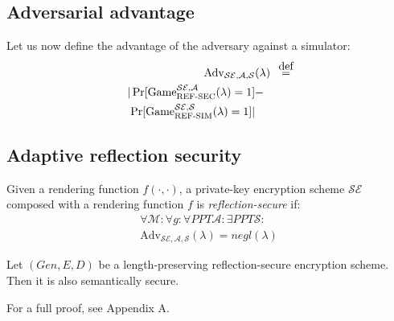 \subsection{Adversarial advantage}\label{subsec:refsecadv}

Let us now define the advantage of the adversary against a simulator:
\begin{align*}
    \text{Adv}_{\mathcal{SE}, \mathcal{A}, \mathcal{S}}&(\lambda) &\defeq\\
    |\Pr[\text{Game}_{\text{REF-SEC}}^{\mathcal{SE},\mathcal{A}}(\lambda) = 1] &-\\
    \Pr[\text{Game}_{\text{REF-SIM}}^{\mathcal{SE},\mathcal{S}}(\lambda) = 1]| &
\end{align*}

\subsection{Adaptive reflection security}\label{subsec:adaptiverefsec}

Given a rendering function $f(\cdot, \cdot)$, a private-key encryption scheme
$\mathcal{SE}$ composed with a rendering function $f$ is
\textit{reflection-secure} if:
\begin{align*}
    \forall \mathcal{M}:
    \forall g:
    \forall PPT \mathcal{A}:
    \exists PPT \mathcal{S}:\\
    \text{Adv}_{\mathcal{SE}, \mathcal{A}, \mathcal{S}}(\lambda) = negl(\lambda)
\end{align*}

\begin{lemma}
    Let $(Gen, E, D)$ be a length-preserving reflection-secure encryption
    scheme. Then it is also semantically secure.
\end{lemma}

For a full proof, see Appendix A.
